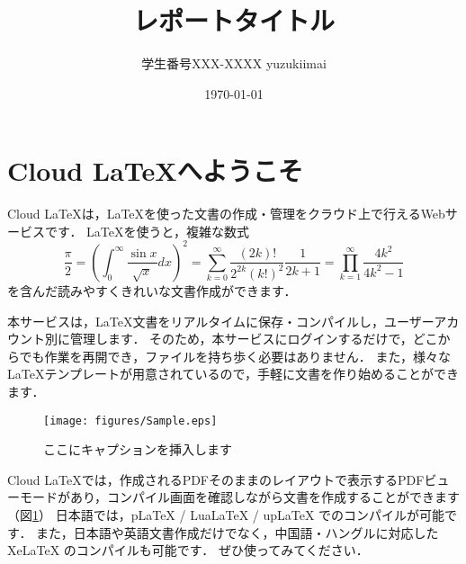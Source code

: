 \documentclass{jsarticle}
\title{レポートタイトル}
\author{学生番号XXX-XXXX yuzukiimai}
\date{\today}
\begin{document}
\maketitle
\section{Cloud LaTeXへようこそ}

Cloud LaTeXは，\LaTeX を使った文書の作成・管理をクラウド上で行えるWebサービスです．
\LaTeX を使うと，複雑な数式
\begin{equation}
  \frac{\pi}{2} =
  \left( \int_{0}^{\infty} \frac{\sin x}{\sqrt{x}} dx \right)^2 =
  \sum_{k=0}^{\infty} \frac{(2k)!}{2^{2k}(k!)^2} \frac{1}{2k+1} =
  \prod_{k=1}^{\infty} \frac{4k^2}{4k^2 - 1}
\end{equation}
を含んだ読みやすくきれいな文書作成ができます．

本サービスは，\LaTeX 文書をリアルタイムに保存・コンパイルし，ユーザーアカウント別に管理します．
そのため，本サービスにログインするだけで，どこからでも作業を再開でき，ファイルを持ち歩く必要はありません．
また，様々な \LaTeX テンプレートが用意されているので，手軽に文書を作り始めることができます．

\begin{figure}
 \centering
   \texttt{[image: figures/Sample.eps]}
 \caption{ここにキャプションを挿入します}
 \label{fig:model}
\end{figure}

Cloud LaTeXでは，作成されるPDFそのままのレイアウトで表示するPDFビューモードがあり，コンパイル画面を確認しながら文書を作成することができます（図\ref{fig:model}）
日本語では，pLaTeX / LuaLaTeX / upLaTeX でのコンパイルが可能です．
また，日本語や英語文書作成だけでなく，中国語・ハングルに対応した XeLaTeX のコンパイルも可能です．
ぜひ使ってみてください．
\end{document}
